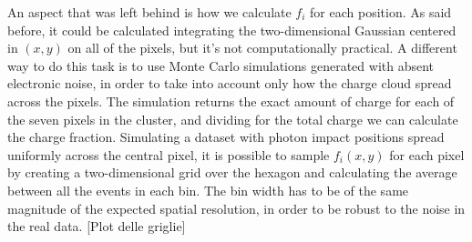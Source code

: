An aspect that was left behind is how we calculate $f_i$ for each position. As said before, it could be calculated integrating the two-dimensional Gaussian centered in $(x, y)$ on all of the pixels, but it's not computationally practical. A different way to do this task is to use Monte Carlo simulations generated with absent electronic noise, in order to take into account only how the charge cloud spread across the pixels. The simulation returns the exact amount of charge for each of the seven pixels in the cluster, and dividing for the total charge we can calculate the charge fraction. Simulating a dataset with photon impact positions spread uniformly across the central pixel, it is possible to sample $f_i(x, y)$ for each pixel by creating a two-dimensional grid over the hexagon and calculating the average between all the events in each bin. The bin width has to be of the same magnitude of the expected spatial resolution, in order to be robust to the noise in the real data.
[Plot delle griglie]



























